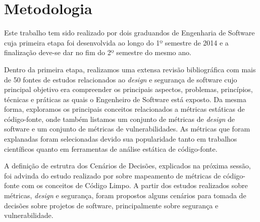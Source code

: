 \section{Metodologia}
\label{sec:methodology}

Este trabalho tem sido realizado por dois graduandos de Engenharia de Software cuja primeira etapa foi desenvolvida ao longo do 1º semestre de 2014 e a finalização deve-se dar no fim do 2º semestre do mesmo ano.
%

Dentro da primeira etapa, realizamos uma extensa revisão bibliográfica com mais de 50 fontes de estudos relacionados ao \emph{design} e segurança de software cujo principal objetivo era compreender os principais aspectos, problemas, princípios, técnicas e práticas as quais o Engenheiro de Software está exposto. Da mesma forma, exploramos os principais conceitos relacionados a métricas estáticas de código-fonte, onde também listamos um conjunto de métricas de \emph{design} de software e um conjunto de métricas de vulnerabilidades. As métricas que foram explanadas foram selecionadas devido sua popularidade tanto em trabalhos científicos quanto em ferramentas de análise estática de código-fonte.

A definição de estrutra dos Cenários de Decisões, explicados na próxima sessão, foi advinda do estudo realizado por \cite{almeida2010} sobre mapeamento de métricas de código-fonte com os conceitos de Código Limpo. A partir dos estudos realizados sobre métricas, \emph{design} e segurança, foram propostos alguns cenários para tomada de decisões sobre projetos de software, principalmente sobre segurança e vulnerabilidade.